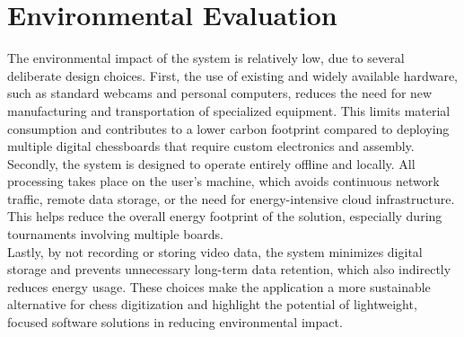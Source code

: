 \newpage

\section{Environmental Evaluation}
The environmental impact of the system is relatively low, due to several deliberate design choices. First, the use of existing and widely available hardware, such as standard webcams and personal computers, reduces the need for new manufacturing and transportation of specialized equipment. This limits material consumption and contributes to a lower carbon footprint compared to deploying multiple digital chessboards that require custom electronics and assembly. \\

Secondly, the system is designed to operate entirely offline and locally. All processing takes place on the user's machine, which avoids continuous network traffic, remote data storage, or the need for energy-intensive cloud infrastructure. This helps reduce the overall energy footprint of the solution, especially during tournaments involving multiple boards. \\

Lastly, by not recording or storing video data, the system minimizes digital storage and prevents unnecessary long-term data retention, which also indirectly reduces energy usage. These choices make the application a more sustainable alternative for chess digitization and highlight the potential of lightweight, focused software solutions in reducing environmental impact.
